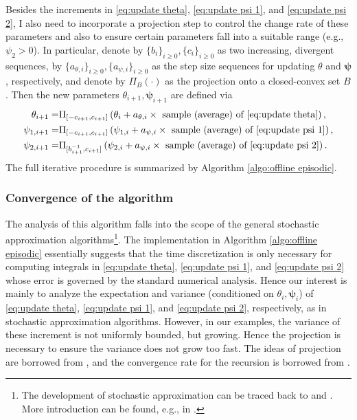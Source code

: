 Besides the increments in \eqref{eq:update theta}, \eqref{eq:update psi 1}, and \eqref{eq:update psi 2}, I also need to incorporate a projection step to control the change rate of these parameters and also to ensure certain parameters fall into a suitable range (e.g., $\psi_2 > 0$). In particular, denote by $\{b_i\}_{i\geq 0},\{c_i\}_{i\geq 0}$ as two increasing, divergent sequences, by $\{a_{\theta,i}\}_{i\geq 0},\{a_{\psi,i}\}_{i\geq 0}$ as the step size sequences for updating $\theta$ and $\bm\psi$, respectively, and denote by $\Pi_B(\cdot)$ as the projection onto a closed-convex set $B$. Then the new parameters $\theta_{i+1},\bm\psi_{i+1}$ are defined via
\begin{equation}
	\label{eq:projection}
	\begin{aligned}
		\theta_{i+1} = & \Pi_{[-c_{i+1}, c_{i+1}]}\left( \theta_i + a_{\theta,i} \times \text{ sample (average) of \eqref{eq:update theta}} \right),\\
		\psi_{1,i+1} = & \Pi_{[-c_{i+1}, c_{i+1}]}\left( \psi_{1,i} + a_{\psi,i} \times \text{ sample (average) of \eqref{eq:update psi 1}} \right),\\
		\psi_{2,i+1} = & \Pi_{[b_{i+1}^{-1}, c_{i+1}]}\left(  \psi_{2,i} + a_{\psi,i} \times \text{ sample (average) of \eqref{eq:update psi 2}} \right) .
	\end{aligned}
\end{equation}
The full iterative procedure is summarized by Algorithm \ref{algo:offline episodic}. 

\subsubsection{Convergence of the algorithm}
\label{subsec:meton convergence results}
The analysis of this algorithm falls into the scope of the general stochastic approximation algorithms\footnote{The development of stochastic approximation can be traced back to \citet{robbins1951stochastic} and \citet{lai2003stochastic}. More introduction can be found, e.g., in \citet{kushner2003stochastic}.}. The implementation in Algorithm  \ref{algo:offline episodic} essentially suggests that the time discretization is only necessary for computing integrals in \eqref{eq:update theta}, \eqref{eq:update psi 1}, and \eqref{eq:update psi 2} whose error is governed by the standard numerical analysis. Hence our interest is mainly to analyze the expectation and variance (conditioned on $\theta_i,\bm\psi_i$) of \eqref{eq:update theta}, \eqref{eq:update psi 1}, and \eqref{eq:update psi 2}, respectively, as in stochastic approximation algorithms. However, in our examples, the variance of these increment is not uniformly bounded, but growing. Hence the projection is necessary to ensure the variance does not grow too fast. The ideas of projection are borrowed from \citet{andradottir1995stochastic}, and the convergence rate for the recursion is borrowed from \citet{broadie2011general}.   


